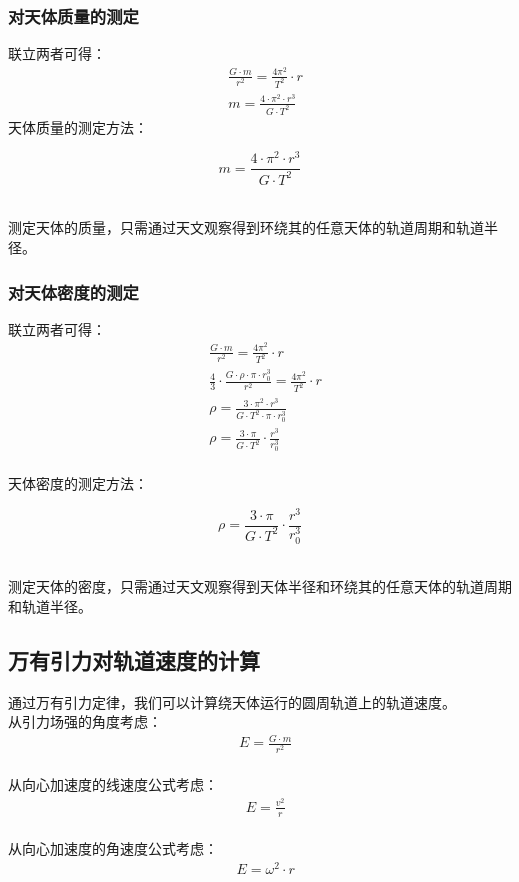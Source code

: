 \documentclass[UTF8]{ctexart}
\begin{document}
\subsubsection{对天体质量的测定}
    联立两者可得：
    \begin{align}
        &\frac{G\cdot m}{r^2}=\frac{4\pi^2}{T^2}\cdot r\\[3mm]
        &m=\frac{4\cdot\pi^2\cdot r^3}{G\cdot T^2}
    \end{align}
    天体质量的测定方法：
    \begin{large}
        \begin{equation*}
            m=\frac{4\cdot\pi^2\cdot r^3}{G\cdot T^2}
        \end{equation*}
    \end{large}\\
    测定天体的质量，只需通过天文观察得到环绕其的任意天体的轨道周期和轨道半径。

\subsubsection{对天体密度的测定}
    联立两者可得：
    \begin{align}
        &\frac{G\cdot m}{r^2}=\frac{4\pi^2}{T^2}\cdot r\\[3mm]
        &\frac{4}{3}\cdot\frac{G\cdot\rho\cdot\pi\cdot r_0^3}{r^2}=\frac{4\pi^2}{T^2}\cdot r\\[3mm]
        &\rho=\frac{3\cdot\pi^2\cdot r^3}{G\cdot T^2\cdot\pi\cdot r_0^3}\\[3mm]
        &\rho=\frac{3\cdot\pi}{G\cdot T^2}\cdot\frac{r^3}{r_0^3} 
    \end{align}\\
    天体密度的测定方法：
    \begin{large}
        \begin{equation*}
            \rho=\frac{3\cdot\pi}{G\cdot T^2}\cdot\frac{r^3}{r_0^3} 
        \end{equation*}
    \end{large}\\
    测定天体的密度，只需通过天文观察得到天体半径和环绕其的任意天体的轨道周期和轨道半径。

\newpage

\subsection{万有引力对轨道速度的计算}
    通过万有引力定律，我们可以计算绕天体运行的圆周轨道上的轨道速度。\\[3mm]
    从引力场强的角度考虑：
    \setcounter{equation}{0}
    \begin{align}
        &E=\frac{G\cdot m}{r^2}
    \end{align}\\
    从向心加速度的线速度公式考虑：
    \begin{align}
        &E=\frac{v^2}{r}
    \end{align}\\
    从向心加速度的角速度公式考虑：
    \begin{align}
        &E=\omega^2\cdot r
    \end{align}
\end{document}
